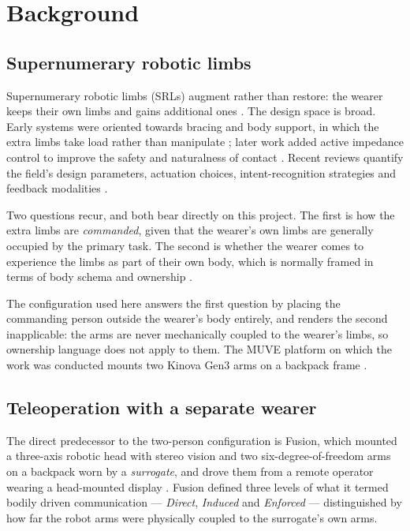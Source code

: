 \chapter{Background}
\label{ch:background}

\section{Supernumerary robotic limbs}

Supernumerary robotic limbs (SRLs) augment rather than restore: the wearer
keeps their own limbs and gains additional ones \cite{tong2021srlreview,
prattichizzo2021augmentation}. The design space is broad. Early systems were
oriented towards bracing and body support, in which the extra limbs take load
rather than manipulate \cite{parietti2016support}; later work added active
impedance control to improve the safety and naturalness of contact
\cite{zhang2023srlreview}. Recent reviews quantify the field's design
parameters, actuation choices, intent-recognition strategies and feedback
modalities \cite{yang2021srlreview, zheng2026quantitative}.

Two questions recur, and both bear directly on this project. The first is how
the extra limbs are \emph{commanded}, given that the wearer's own limbs are
generally occupied by the primary task. The second is whether the wearer comes
to experience the limbs as part of their own body, which is normally framed in
terms of body schema and ownership \cite{pinardi2023feedback}.

The configuration used here answers the first question by placing the
commanding person outside the wearer's body entirely, and renders the second
inapplicable: the arms are never mechanically coupled to the wearer's limbs,
so ownership language does not apply to them. The MUVE platform on which the
work was conducted mounts two Kinova Gen3 arms on a backpack frame
\cite{muve, kinova2022gen3}.

\section{Teleoperation with a separate wearer}

The direct predecessor to the two-person configuration is Fusion, which
mounted a three-axis robotic head with stereo vision and two six-degree-of-freedom
arms on a backpack worn by a \emph{surrogate}, and drove them from a remote
operator wearing a head-mounted display \cite{saraiji2018fusion}. Fusion
defined three levels of what it termed bodily driven communication ---
\emph{Direct}, \emph{Induced} and \emph{Enforced} --- distinguished by how far
the robot arms were physically coupled to the surrogate's own arms.


